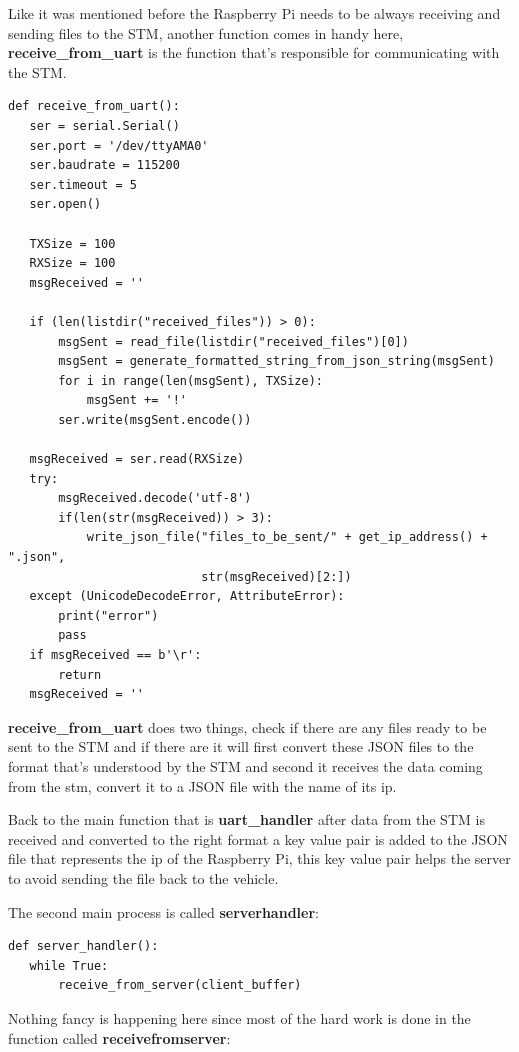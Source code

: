 Like it was mentioned before the Raspberry Pi needs to be always receiving and sending files to the STM, another function comes in handy here, \textbf{receive\_from\_uart} is the function that’s responsible for communicating with the STM.
\begin{lstlisting}
def receive_from_uart():
   ser = serial.Serial()
   ser.port = '/dev/ttyAMA0'
   ser.baudrate = 115200
   ser.timeout = 5
   ser.open()
 
   TXSize = 100
   RXSize = 100
   msgReceived = ''
 
   if (len(listdir("received_files")) > 0):
       msgSent = read_file(listdir("received_files")[0])
       msgSent = generate_formatted_string_from_json_string(msgSent)
       for i in range(len(msgSent), TXSize):
           msgSent += '!'
       ser.write(msgSent.encode())
 
   msgReceived = ser.read(RXSize)
   try:
       msgReceived.decode('utf-8')
       if(len(str(msgReceived)) > 3):
           write_json_file("files_to_be_sent/" + get_ip_address() + ".json",
                           str(msgReceived)[2:])
   except (UnicodeDecodeError, AttributeError):
       print("error")
       pass
   if msgReceived == b'\r':
       return
   msgReceived = ''

\end{lstlisting}
\clearpage
\textbf{receive\_from\_uart} does two things, check if there are any files ready to be sent to the STM and if there are it will first convert these JSON files to the format that’s understood by the STM and second it receives the data coming from the stm, convert it to a JSON file with the name of its ip.

Back to the main function that is \textbf{uart\_handler} after data from the STM is received and converted to the right format a key value pair is added to the JSON file that represents the ip of the Raspberry Pi, this key value pair helps the server to avoid sending the file back to the vehicle.

The second main process is called \textbf{server\textunderscore handler}:

\begin{lstlisting}
def server_handler():
   while True:
       receive_from_server(client_buffer)
\end{lstlisting}

Nothing fancy is happening here since most of the hard work is done in the function called \textbf{receive\textunderscore from\textunderscore server}:

